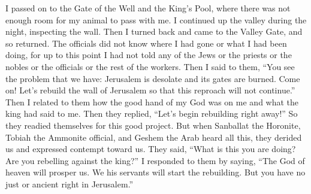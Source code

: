 {I passed
on to
the Gate
of the Well and the King’s
Pool,
where
there was not
enough room
for my animal
to pass with me.
I continued
up
the valley
during the night,
inspecting
the wall.
Then I turned back
and came
to the Valley
Gate,
and so returned.
The officials
did not
know
where
I had gone
or what
I
had been doing,
for up to
this point
I had not
told
any of the Jews
or the priests
or the nobles
or the officials
or the rest
of the workers.
Then I said
to them,
“You
see
the problem
that
we
have: Jerusalem
is desolate
and its gates
are burned.
Come on! Let’s
rebuild
the wall
of Jerusalem
so that this reproach
will not
continue.”
Then I related
to them how the good
hand
of my God
was
on
me and what
the king
had
said
to me. Then they replied,
“Let’s begin
rebuilding
right away!” So they readied
themselves for this good project.
But when
Sanballat
the Horonite,
Tobiah
the Ammonite
official,
and Geshem
the Arab
heard all this, they derided
us and expressed contempt
toward us.
They said,
“What
is this
you
are doing? Are you
rebelling
against
the king?”
I responded
to them by saying,
“The God
of heaven
will prosper
us. We
his servants
will start
the rebuilding.
But
you have
no
just or ancient
right
in Jerusalem.”

}
